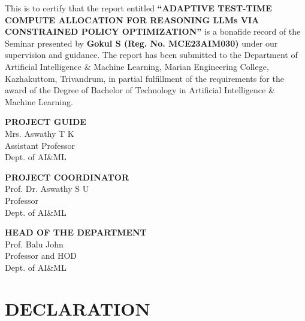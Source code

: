 \documentclass[12pt,a4paper,titlepage]{report}
\begin{document}
\vspace{0.3cm}
\noindent\sloppy
This is to certify that the report entitled \textbf{``ADAPTIVE TEST-TIME COMPUTE ALLOCATION FOR REASONING LLMs VIA CONSTRAINED POLICY OPTIMIZATION''} is a bonafide record of the Seminar presented by \textbf{Gokul S (Reg. No. MCE23AIM030)} under our supervision and guidance. The report has been submitted to the Department of Artificial Intelligence \& Machine Learning, Marian Engineering College, Kazhakuttom, Trivandrum, in partial fulfillment of the requirements for the award of the Degree of Bachelor of Technology in Artificial Intelligence \& Machine Learning.

\vspace{1.2cm}

\noindent
\begin{minipage}[t]{0.45\textwidth}
\begin{center}
\textbf{PROJECT GUIDE}\\[0.2cm]
Mrs. Aswathy T K\\
Assistant Professor\\
Dept. of AI\&ML
\end{center}
\end{minipage}
\hfill
\begin{minipage}[t]{0.45\textwidth}
\begin{center}
\textbf{PROJECT COORDINATOR}\\[0.2cm]
Prof. Dr. Aswathy S U\\
Professor\\
Dept. of AI\&ML
\end{center}
\end{minipage}

\vspace{1.0cm}

\begin{center}
\textbf{HEAD OF THE DEPARTMENT}\\[0.2cm]
Prof. Balu John\\
Professor and HOD\\
Dept. of AI\&ML
\end{center}


\clearpage

\pagestyle{preliminary}

\chapter*{DECLARATION}
\setcounter{page}{1}
\end{document}
